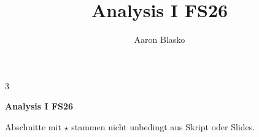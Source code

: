 \documentclass[8pt, a4paper]{extarticle}
\title{Analysis I FS26}
\author{Aaron Blasko}
\date{}
\numberwithin{equation}{section}
\begin{document}
\begin{multicols*}{3}

    {\large \textbf{Analysis I FS26}}

    Abschnitte mit $\star$ stammen nicht unbedingt aus Skript oder Slides.

    
    
    

\end{multicols*}
\end{document}
